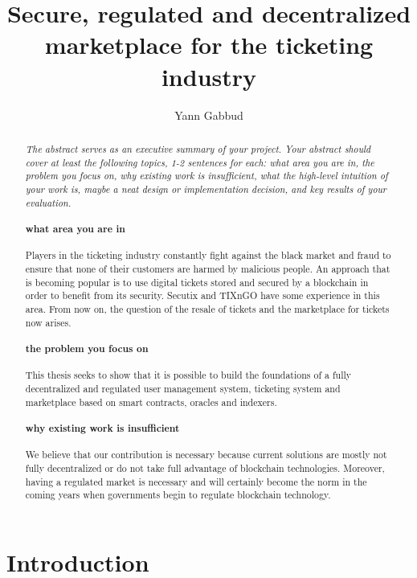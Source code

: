 \documentclass[a4paper,11pt,oneside]{report}
\title{Secure, regulated and decentralized marketplace for the ticketing industry}
\author{Yann Gabbud}
\affiliation{Distributed Computing Laboratory \\
and \\
Secutix SA, an ELCA company \\}
\begin{document}
\maketitle
\makeacks

\begin{abstract}
\textit{The abstract serves as an executive summary of your project.
Your abstract should cover at least the following topics, 1-2 sentences for
each: what area you are in, the problem you focus on, why existing work is
insufficient, what the high-level intuition of your work is, maybe a neat
design or implementation decision, and key results of your evaluation.} \\


\paragraph{what area you are in} Players in the ticketing industry constantly fight against the black market and fraud to ensure that none of their customers are harmed by malicious people. An approach that is becoming popular is to use digital tickets stored and secured by a blockchain in order to benefit from its security. Secutix and TIXnGO have some experience in this area. From now on, the question of the resale of tickets and the marketplace for tickets now arises.

\paragraph{the problem you focus on} This thesis seeks to show that it is possible to build the foundations of a fully decentralized and regulated user management system, ticketing system and marketplace based on smart contracts, oracles and indexers.

\paragraph{why existing work is insufficient} We believe that our contribution is necessary because current solutions are mostly not fully decentralized or do not take full advantage of blockchain technologies. Moreover, having a regulated market is necessary and will certainly become the norm in the coming years when governments begin to regulate blockchain technology. 
\end{abstract}

\maketoc

\chapter{Introduction}
\end{document}
